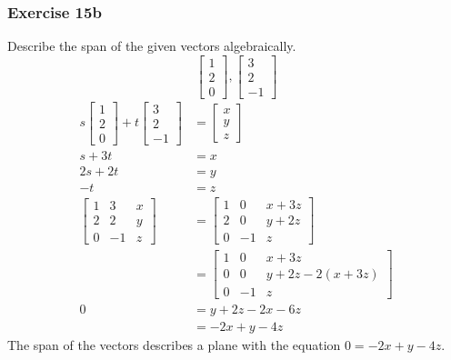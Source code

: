 \documentclass[letterpaper, 12pt]{math}
\begin{document}
\subsubsection*{Exercise 15b}
Describe the span of the given vectors algebraically.
\[ \begin{bmatrix}1 \\ 2 \\ 0\end{bmatrix},
  \begin{bmatrix}3 \\ 2 \\ -1\end{bmatrix} \]
\begin{align*}
  s\begin{bmatrix}1 \\ 2 \\ 0\end{bmatrix}+
    t\begin{bmatrix}3 \\ 2 \\ -1\end{bmatrix} &=
    \begin{bmatrix}x \\ y \\ z\end{bmatrix} \\
  s+3t &= x \\
  2s+2t &= y \\
  -t &= z \\
  \begin{bmatrix}
    1 & 3 & x \\
    2 & 2 & y \\
    0 & -1 & z
  \end{bmatrix} &= \begin{bmatrix}
    1 & 0 & x+3z \\
    2 & 0 & y+2z \\
    0 & -1 & z
  \end{bmatrix} \\
  &= \begin{bmatrix}
    1 & 0 & x+3z \\
    0 & 0 & y+2z-2(x+3z) \\
    0 & -1 & z
  \end{bmatrix} \\
  0 &= y+2z-2x-6z \\
  &= -2x+y-4z
\end{align*}
The span of the vectors describes a plane with the equation \( 0 = -2x+y-4z \).
\end{document}
